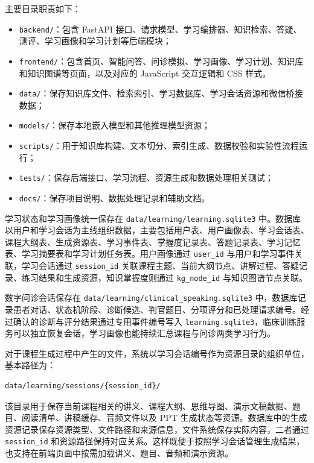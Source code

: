 主要目录职责如下：

\begin{itemize}
  \item \texttt{backend/}：包含 FastAPI 接口、请求模型、学习编排器、知识检索、答疑、测评、学习画像和学习计划等后端模块；
  \item \texttt{frontend/}：包含首页、智能问答、问诊模拟、学习画像、学习计划、知识库和知识图谱等页面，以及对应的 JavaScript 交互逻辑和 CSS 样式。
  \item \texttt{data/}：保存知识库文件、检索索引、学习数据库、学习会话资源和微信桥接数据；
  \item \texttt{models/}：保存本地嵌入模型和其他推理模型资源；
  \item \texttt{scripts/}：用于知识库构建、文本切分、索引生成、数据校验和实验性流程运行；
  \item \texttt{tests/}：保存后端接口、学习流程、资源生成和数据处理相关测试；
  \item \texttt{docs/}：保存项目说明、数据处理记录和辅助文档。
\end{itemize}

学习状态和学习画像统一保存在 \texttt{data/learning/learning.sqlite3} 中。数据库以用户和学习会话为主线组织数据，主要包括用户表、用户画像表、学习会话表、课程大纲表、生成资源表、学习事件表、掌握度记录表、答题记录表、学习记忆表、学习摘要表和学习计划任务表。用户画像通过 \texttt{user\_id} 与用户和学习事件关联，学习会话通过 \texttt{session\_id} 关联课程主题、当前大纲节点、讲解过程、答疑记录、练习结果和生成资源，知识掌握度则通过 \texttt{kg\_node\_id} 与知识图谱节点关联。

数字问诊会话保存在 \texttt{data/learning/clinical\_speaking.sqlite3} 中，数据库记录患者对话、状态机阶段、诊断候选、判官题目、分项评分和已处理请求编号。经过确认的诊断与评分结果通过专用事件编号写入 \texttt{learning.sqlite3}，临床训练服务可以独立恢复会话，学习画像也能持续汇总课程与问诊两类学习行为。

对于课程生成过程中产生的文件，系统以学习会话编号作为资源目录的组织单位，基本路径为：

\begin{lstlisting}
data/learning/sessions/{session_id}/
\end{lstlisting}

该目录用于保存当前课程相关的讲义、课程大纲、思维导图、演示文稿数据、题目、阅读清单、讲稿缓存、音频文件以及 PPT 生成状态等资源。数据库中的生成资源记录保存资源类型、文件路径和来源信息，文件系统保存实际内容，二者通过 \texttt{session\_id} 和资源路径保持对应关系。这样既便于按照学习会话管理生成结果，也支持在前端页面中按需加载讲义、题目、音频和演示资源。

